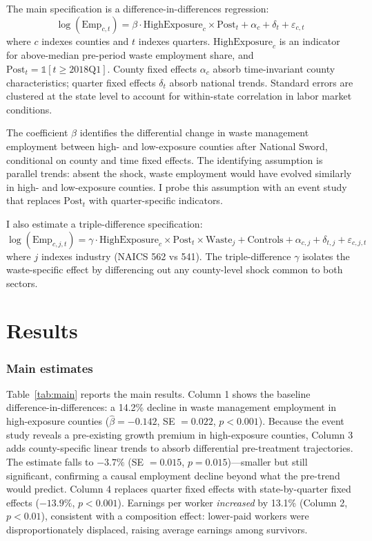 \documentclass[12pt]{article}
\begin{document}
The main specification is a difference-in-differences regression:
\begin{equation}
\log(\text{Emp}_{c,t}) = \beta \cdot \text{HighExposure}_c \times \text{Post}_t + \alpha_c + \delta_t + \varepsilon_{c,t}
\label{eq:did}
\end{equation}
where $c$ indexes counties and $t$ indexes quarters. $\text{HighExposure}_c$ is an indicator for above-median pre-period waste employment share, and $\text{Post}_t = \mathbb{1}[t \geq 2018\text{Q1}]$. County fixed effects $\alpha_c$ absorb time-invariant county characteristics; quarter fixed effects $\delta_t$ absorb national trends. Standard errors are clustered at the state level to account for within-state correlation in labor market conditions.

The coefficient $\beta$ identifies the differential change in waste management employment between high- and low-exposure counties after National Sword, conditional on county and time fixed effects. The identifying assumption is parallel trends: absent the shock, waste employment would have evolved similarly in high- and low-exposure counties. I probe this assumption with an event study that replaces $\text{Post}_t$ with quarter-specific indicators.

I also estimate a triple-difference specification:
\begin{equation}
\log(\text{Emp}_{c,j,t}) = \gamma \cdot \text{HighExposure}_c \times \text{Post}_t \times \text{Waste}_j + \text{Controls} + \alpha_{c,j} + \delta_{t,j} + \varepsilon_{c,j,t}
\label{eq:ddd}
\end{equation}
where $j$ indexes industry (NAICS 562 vs 541). The triple-difference $\gamma$ isolates the waste-specific effect by differencing out any county-level shock common to both sectors.

\section{Results}

\subsubsection*{Main estimates} Table~\ref{tab:main} reports the main results. Column 1 shows the baseline difference-in-differences: a 14.2\% decline in waste management employment in high-exposure counties ($\hat{\beta} = -0.142$, SE $= 0.022$, $p < 0.001$). Because the event study reveals a pre-existing growth premium in high-exposure counties, Column 3 adds county-specific linear trends to absorb differential pre-treatment trajectories. The estimate falls to $-3.7\%$ (SE $= 0.015$, $p = 0.015$)---smaller but still significant, confirming a causal employment decline beyond what the pre-trend would predict. Column 4 replaces quarter fixed effects with state-by-quarter fixed effects ($-13.9\%$, $p < 0.001$). Earnings per worker \textit{increased} by 13.1\% (Column 2, $p < 0.01$), consistent with a composition effect: lower-paid workers were disproportionately displaced, raising average earnings among survivors.
\end{document}
